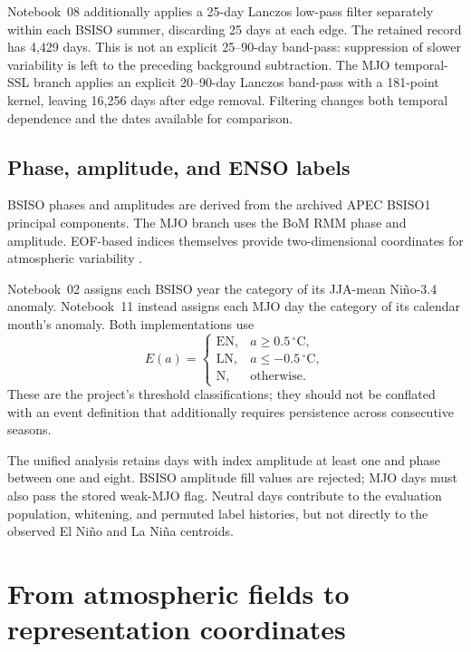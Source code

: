 \documentclass[11pt]{article}
\newcommand{\EN}{\mathrm{EN}}
\newcommand{\LN}{\mathrm{LN}}
\newcommand{\Neu}{\mathrm{N}}
\begin{document}
Notebook~08 additionally applies a 25-day Lanczos low-pass filter separately within each BSISO summer, discarding 25 days at each edge. The retained record has 4,429 days. This is not an explicit 25--90-day band-pass: suppression of slower variability is left to the preceding background subtraction. The MJO temporal-SSL branch applies an explicit 20--90-day Lanczos band-pass with a 181-point kernel, leaving 16,256 days after edge removal. Filtering changes both temporal dependence and the dates available for comparison.

\subsection{Phase, amplitude, and ENSO labels}

BSISO phases and amplitudes are derived from the archived APEC BSISO1 principal components. The MJO branch uses the BoM RMM phase and amplitude. EOF-based indices themselves provide two-dimensional coordinates for atmospheric variability \cite{lee2013,wheeler2004}.

Notebook~02 assigns each BSISO year the category of its JJA-mean Ni\~no-3.4 anomaly. Notebook~11 instead assigns each MJO day the category of its calendar month's anomaly. Both implementations use
\begin{equation}
E(a)=
\begin{cases}
\EN,&a\geq0.5\,{}^\circ\mathrm C,\\
\LN,&a\leq-0.5\,{}^\circ\mathrm C,\\
\Neu,&\text{otherwise}.
\end{cases}
\end{equation}
These are the project's threshold classifications; they should not be conflated with an event definition that additionally requires persistence across consecutive seasons.

The unified analysis retains days with index amplitude at least one and phase between one and eight. BSISO amplitude fill values are rejected; MJO days must also pass the stored weak-MJO flag. Neutral days contribute to the evaluation population, whitening, and permuted label histories, but not directly to the observed El Ni\~no and La Ni\~na centroids.

\section{From atmospheric fields to representation coordinates}
\label{sec:encoding}
\end{document}
